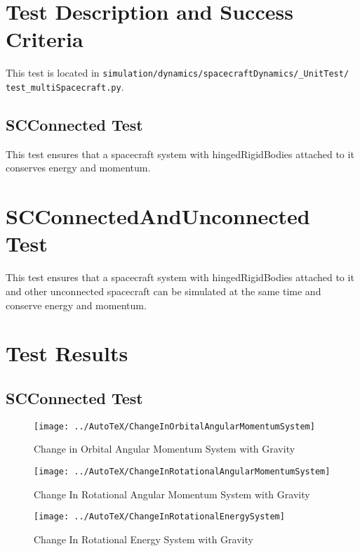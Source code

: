 
\section{Test Description and Success Criteria}
This test is located in \texttt{simulation/dynamics/spacecraftDynamics/\_UnitTest/\newline
test\_multiSpacecraft.py}. 

\subsection{SCConnected Test}
This test ensures that a spacecraft system with hingedRigidBodies attached to it conserves energy and momentum.

\section{SCConnectedAndUnconnected Test}
This test ensures that a spacecraft system with hingedRigidBodies attached to it and other unconnected spacecraft can be simulated at the same time and conserve energy and momentum.

\section{Test Results}

\subsection{SCConnected Test}
\begin{figure}[htbp]
	\centerline{
		\texttt{[image: ../AutoTeX/ChangeInOrbitalAngularMomentumSystem]}}
	\caption{Change in Orbital Angular Momentum System with Gravity}
	\label{fig:ChangeInOrbitalAngularMomentumSystem}
\end{figure}

\begin{figure}[htbp]
	\centerline{
		\texttt{[image: ../AutoTeX/ChangeInRotationalAngularMomentumSystem]}}
	\caption{Change In Rotational Angular Momentum System with Gravity}
	\label{fig:ChangeInRotationalAngularMomentumSystem}
\end{figure}

\begin{figure}[htbp]
	\centerline{
		\texttt{[image: ../AutoTeX/ChangeInRotationalEnergySystem]}}
	\caption{Change In Rotational Energy System with Gravity}
	\label{fig:ChangeInRotationalEnergySystem}
\end{figure}

